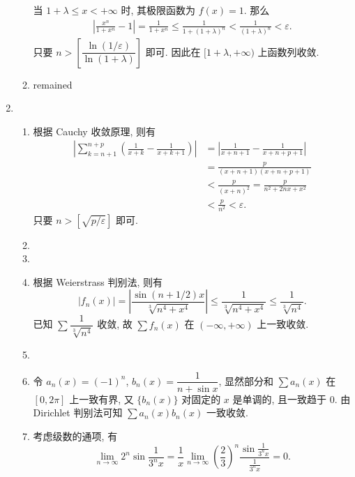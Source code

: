 \begin{enumerate}
\begin{enumerate}[(1)]
                当 $1+\lambda \leq x < +\infty$ 时, 其极限函数为 $f(x) = 1$. 那么
                \begin{align*}
                    \left|\frac{x^n}{1+x^n} - 1\right| = \frac{1}{1+x^n} \leq \frac{1}{1+(1+\lambda)^n} < \frac{1}{(1+\lambda)^n} < \varepsilon.
                \end{align*}
                只要 $n > \left[\dfrac{\ln(1/\varepsilon)}{\ln(1+\lambda)}\right]$ 即可. 因此在 $[1+\lambda, +\infty)$ 上函数列收敛.
            \item %
                {\color{red}remained}
        \end{enumerate}
    \item %
        \begin{enumerate}[(1)]
            \item %
                根据 Cauchy 收敛原理, 则有
                \begin{align*}
                    \left| \sum_{k=n+1}^{n+p}\left(\frac{1}{x+k} - \frac{1}{x+k+1}\right) \right| &= \left|\frac{1}{x+n+1} - \frac{1}{x+n+p+1}\right| \\
                    &= \frac{p}{(x+n+1)(x+n+p+1)} \\
                    &< \frac{p}{(x+n)^2} = \frac{p}{n^2 + 2nx + x^2} \\
                    &< \frac{p}{n^2} < \varepsilon.
                \end{align*}
                只要 $n > [\sqrt{p/\varepsilon}]$ 即可.
            \item %
            \item %
            \item %
                根据 Weierstrass 判别法, 则有
                \[
                    |f_n(x)| = \left| \frac{\sin(n+1/2)x}{\sqrt[3]{n^4+x^4}} \right| \leq \frac{1}{\sqrt[3]{n^4+x^4}} \leq \frac{1}{\sqrt[3]{n^4}}.    
                \]
                已知 $\sum\dfrac{1}{\sqrt[3]{n^4}}$ 收敛, 故 $\sum{f_n(x)}$ 在 $(-\infty, +\infty)$ 上一致收敛.
            \item %
            \item %
                令 $a_n(x) = (-1)^n$, $b_n(x) = \dfrac{1}{n+\sin{x}}$, 显然部分和 $\sum{a_n(x)}$ 在 $[0, 2\pi]$ 上一致有界,
                又 $\{b_n(x)\}$ 对固定的 $x$ 是单调的, 且一致趋于 $0$. 由 Dirichlet 判别法可知 $\sum{a_n(x)b_n(x)}$ 一致收敛.
            \item %
                考虑级数的通项, 有
                \[
                    \lim_{n\to\infty}2^n\sin\frac{1}{3^nx} = \frac1x\lim_{n\to\infty}\left(\frac23\right)^n\frac{\sin\frac{1}{3^nx}}{\frac{1}{3^nx}} = 0.    
\]
\end{enumerate}
\end{enumerate}
